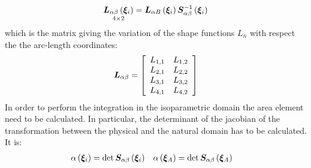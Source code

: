 \begin{equation}
\underset{ 4 \times 2 } { \T{ L }_{ \alpha \beta } \valxii }=
\T{ L }_{ \alpha B } \valxii \T{S}_{\alpha \beta} ^{-1} \valxii
\end{equation}
which is the matrix giving the variation of the shape functions $L_n$ with respect the the arc-length coordinates:
\begin{equation}
\T{L}_{\alpha \beta} =
\sqbr{ \matr{ c c }{
L_{1,1} & L_{1,2} \\
L_{2,1} & L_{2,2} \\
L_{3,1} & L_{3,2} \\
L_{4,1} & L_{4,2}
}}
\end{equation}
In order to perform the integration in the isoparametric domain the area element need to be calculated. In particular, the determinant of the jacobian of the transformation between the physical and the natural domain has to be calculated. It is:
\begin{align}
\alpha \valxii & = \det \T{ S }_{\alpha \beta} \valxii &
\alpha \valxiA & = \det \T{ S }_{\alpha \beta} \valxiA
\end{align}
